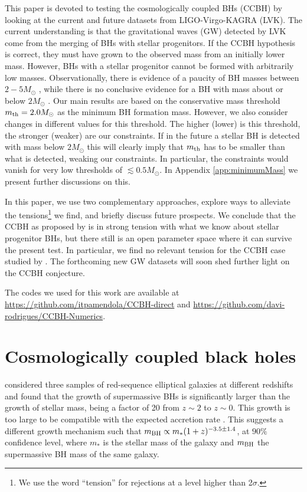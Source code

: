 \documentclass[fleqn,usenatbib,useAMS]{mnras}
\begin{document}
This paper is devoted to testing the cosmologically coupled BHs (CCBH) by looking at the current and future datasets from LIGO-Virgo-KAGRA (LVK). The current understanding is that the gravitational waves (GW) detected by LVK come from the merging of BHs with stellar progenitors. If the CCBH hypothesis is correct, they must have grown to the observed mass from an initially lower mass. However, BHs with a stellar progenitor cannot be formed with arbitrarily low masses. Observationally, there is evidence of a paucity of BH masses between $2-5 M_{\odot}$ \citep{2010ApJ...725.1918O, KAGRA:2021duu, deSa:2022qny}, while there is no conclusive evidence for a BH with mass about or below $2 M_\odot$ \citep[see also][]{LIGOScientific:2022hai}. 
Our main results are based on the conservative {mass threshold $m_{\rm th} =  2.0 M_\odot$} as the minimum BH formation mass. However, we also consider changes in different values for this threshold. {The higher (lower) is this threshold, the stronger (weaker) are our constraints. If in the future a stellar BH is detected with mass below $2 M_\odot$ this will clearly imply that $m_{\rm th}$ has to be smaller than what is detected, weaking our constraints. In particular, the constraints would vanish for very low thresholds of $\lesssim 0.5 M_\odot$.}
In Appendix \ref{app:minimumMass} we present further discussions on this.

In this paper, we 
use two complementary approaches, explore ways to alleviate the tensions\footnote{We use the word ``tension'' for rejections at a level higher than 2$\sigma$.} we find, and briefly discuss future prospects. We conclude that the CCBH as proposed by \citet{Farrah:2023opk} is in strong tension with what we know about stellar progenitor BHs, but there  still is an open parameter space where it can survive the present test. In particular, we find no relevant tension for the CCBH case studied by \citet{Croker:2021duf}. The forthcoming new GW datasets will soon shed further light on the CCBH conjecture.

The codes we used for this work are available at \url{https://github.com/itpamendola/CCBH-direct}  and \url{https://github.com/davi-rodrigues/CCBH-Numerics}.


\section{Cosmologically coupled black holes} \label{sec:review}


\citet{2023ApJ...943..133F} considered three samples of red-sequence elliptical galaxies at different redshifts and found that the growth of supermassive BHs is significantly larger than the growth of stellar mass, being a factor of 20 from $z\sim 2$ to $z\sim 0$. This growth is too large to be compatible with the expected  accretion rate \citep{2023ApJ...943..133F}. This suggests a different growth mechanism  such that  $m_{\rm BH} \propto m_* (1+z)^{-3.5 \pm 1.4}$, 
at $90\%$ confidence level, where $m_*$ is the stellar mass of the galaxy and $m_{\rm BH}$ the supermassive BH mass of the same galaxy. 
\end{document}
